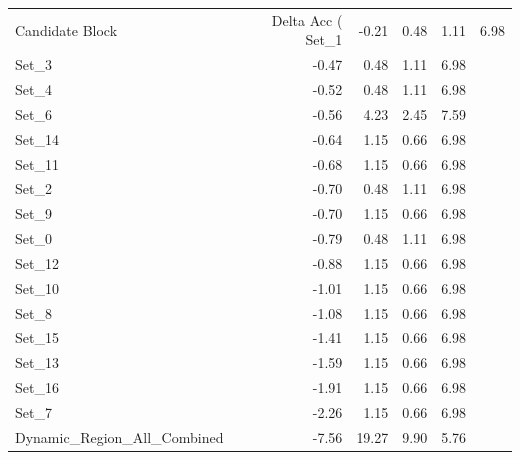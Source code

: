 \begin{tabular}{lrrrr}
\toprule
Candidate Block & Delta Acc (%
\midrule
Set_1 & -0.21 & 0.48 & 1.11 & 6.98 \\
Set_3 & -0.47 & 0.48 & 1.11 & 6.98 \\
Set_4 & -0.52 & 0.48 & 1.11 & 6.98 \\
Set_6 & -0.56 & 4.23 & 2.45 & 7.59 \\
Set_14 & -0.64 & 1.15 & 0.66 & 6.98 \\
Set_11 & -0.68 & 1.15 & 0.66 & 6.98 \\
Set_2 & -0.70 & 0.48 & 1.11 & 6.98 \\
Set_9 & -0.70 & 1.15 & 0.66 & 6.98 \\
Set_0 & -0.79 & 0.48 & 1.11 & 6.98 \\
Set_12 & -0.88 & 1.15 & 0.66 & 6.98 \\
Set_10 & -1.01 & 1.15 & 0.66 & 6.98 \\
Set_8 & -1.08 & 1.15 & 0.66 & 6.98 \\
Set_15 & -1.41 & 1.15 & 0.66 & 6.98 \\
Set_13 & -1.59 & 1.15 & 0.66 & 6.98 \\
Set_16 & -1.91 & 1.15 & 0.66 & 6.98 \\
Set_7 & -2.26 & 1.15 & 0.66 & 6.98 \\
Dynamic_Region_All_Combined & -7.56 & 19.27 & 9.90 & 5.76 \\
\bottomrule
\end{tabular}
